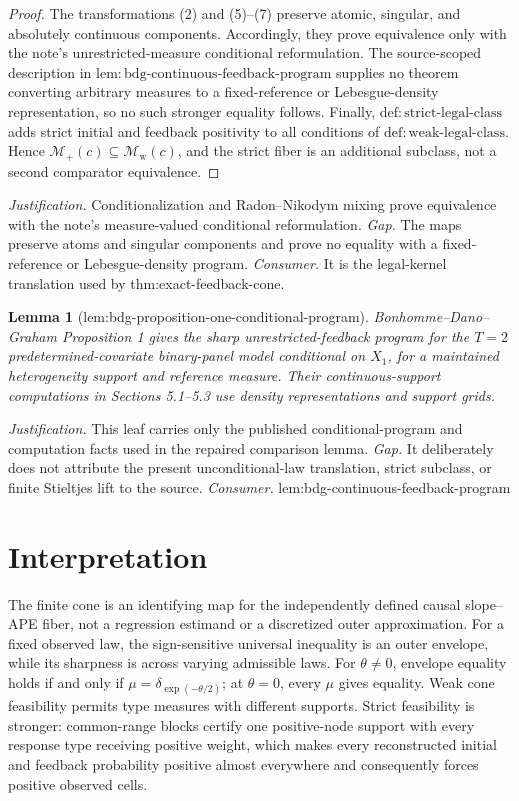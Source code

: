 \documentclass{article}
\newtheorem{lemma}{Lemma}
\begin{document}
\begin{proof}
The transformations (2) and (5)--(7) preserve atomic, singular, and absolutely continuous components.  Accordingly, they prove equivalence only with the note's unrestricted-measure conditional reformulation.  The source-scoped description in \(\mathrm{lem{:}bdg\text{-}continuous\text{-}feedback\text{-}program}\) supplies no theorem converting arbitrary measures to a fixed-reference or Lebesgue-density representation, so no such stronger equality follows.  Finally, \(\mathrm{def{:}strict\text{-}legal\text{-}class}\) adds strict initial and feedback positivity to all conditions of \(\mathrm{def{:}weak\text{-}legal\text{-}class}\).  Hence \(\mathcal M_+(c)\subseteq\mathcal M_{\mathrm w}(c)\), and the strict fiber is an additional subclass, not a second comparator equivalence.
\end{proof}
\par\smallskip\noindent \textit{Justification.} Conditionalization and Radon--Nikodym mixing prove equivalence with the note's measure-valued conditional reformulation. \textit{Gap.} The maps preserve atoms and singular components and prove no equality with a fixed-reference or Lebesgue-density program. \textit{Consumer.} It is the legal-kernel translation used by thm:exact-feedback-cone.

\begin{lemma}[lem:bdg-proposition-one-conditional-program]\label{lem:bdg-proposition-one-conditional-program}
Bonhomme--Dano--Graham Proposition 1 gives the sharp unrestricted-feedback program for the \(T=2\) predetermined-covariate binary-panel model conditional on \(X_1\), for a maintained heterogeneity support and reference measure.  Their continuous-support computations in Sections 5.1--5.3 use density representations and support grids.
\end{lemma}
\par\smallskip\noindent \textit{Justification.} This leaf carries only the published conditional-program and computation facts used in the repaired comparison lemma. \textit{Gap.} It deliberately does not attribute the present unconditional-law translation, strict subclass, or finite Stieltjes lift to the source. \textit{Consumer.} lem:bdg-continuous-feedback-program

\section{Interpretation}

The finite cone is an identifying map for the independently defined causal slope--APE fiber, not a regression estimand or a discretized outer approximation. For a fixed observed law, the sign-sensitive universal inequality is an outer envelope, while its sharpness is across varying admissible laws. For \(\theta\ne0\), envelope equality holds if and only if \(\mu=\delta_{\exp(-\theta/2)}\); at \(\theta=0\), every \(\mu\) gives equality. Weak cone feasibility permits type measures with different supports. Strict feasibility is stronger: common-range blocks certify one positive-node support with every response type receiving positive weight, which makes every reconstructed initial and feedback probability positive almost everywhere and consequently forces positive observed cells.
\end{document}
